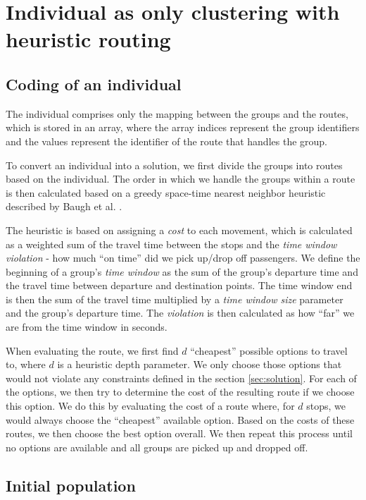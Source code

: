 \section{Individual as only clustering with heuristic routing}\label{sec:evoh}

\subsection{Coding of an individual}

The individual comprises only the mapping between the groups and the routes, which is stored in an array, where the array indices represent the group identifiers and the values represent the identifier of the route that handles the group.

To convert an individual into a solution, we first divide the groups into routes based on the individual. The order in which we handle the groups within a route is then calculated based on a greedy space-time nearest neighbor heuristic described by Baugh et al. \cite{Baugh1998INTRACTABILITYOT}.

The heuristic is based on assigning a \textit{cost} to each movement, which is calculated as a weighted sum of the travel time between the stops and the \textit{time window violation} - how much ``on time'' did we pick up/drop off passengers. We define the beginning of a group's \textit{time window} as the sum of the group's departure time and the travel time between departure and destination points. The time window end is then the sum of the travel time multiplied by a \textit{time window size} parameter and the group's departure time. The \textit{violation} is then calculated as how ``far'' we are from the time window in seconds.

When evaluating the route, we first find $d$ ``cheapest'' possible options to travel to, where $d$ is a heuristic depth parameter. We only choose those options that would not violate any constraints defined in the section \ref{sec:solution}. For each of the options, we then try to determine the cost of the resulting route if we choose this option. We do this by evaluating the cost of a route where, for $d$ stops, we would always choose the ``cheapest'' available option. Based on the costs of these routes, we then choose the best option overall. We then repeat this process until no options are available and all groups are picked up and dropped off.

\subsection{Initial population}

